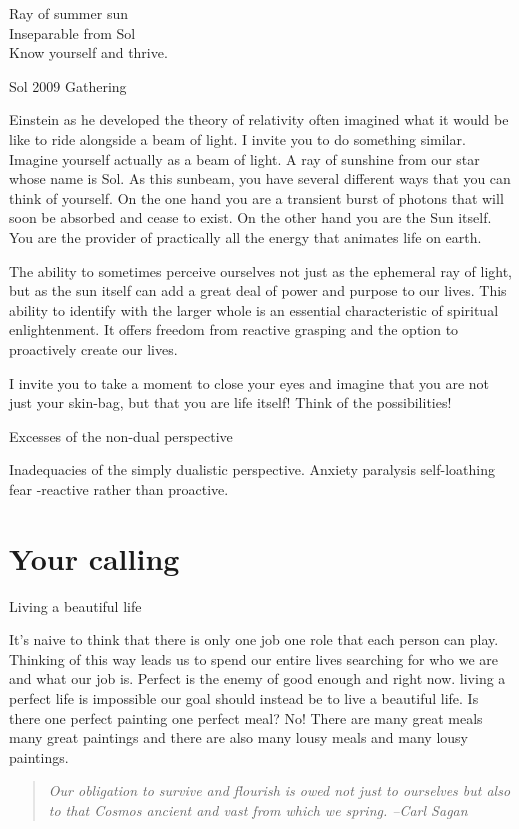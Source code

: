 \documentclass[ebook,12pt,openany,twoside]{memoir}
\begin{document}
\setlength\epigraphwidth{1.8in}
\epigraph{
  Ray of summer sun\\
  Inseparable from Sol\\
  Know yourself and thrive.
}{Sol 2009 Gathering}

\noindent Einstein as he developed the theory of relativity often imagined what it would
be like to ride alongside a beam of light. I invite you to do something
similar. Imagine yourself actually as a beam of light. A ray of sunshine from
our star whose name is Sol. As this sunbeam, you have several different ways
that you can think of yourself. On the one hand you are a transient burst of
photons that will soon be absorbed and cease to exist. On the other hand you
are the Sun itself. You are the provider of practically all the energy that
animates life on earth.

The ability to sometimes perceive ourselves not just as the ephemeral ray of
light, but as the sun itself can add a great deal of power and purpose to our
lives. This ability to identify with the larger whole is an essential
characteristic of spiritual enlightenment. It offers freedom from reactive
grasping and the option to proactively create our lives.

I invite you to take a moment to close your eyes and imagine that you are not
just your skin-bag, but that you are life itself! Think of the possibilities!

Excesses of the non-dual perspective

Inadequacies of the simply dualistic perspective. Anxiety paralysis
self-loathing fear -reactive rather than proactive.


\section*{Your calling}

Living a beautiful life

It's naive to think that there is only one job one role that each person can
play. Thinking of this way leads us to spend our entire lives searching for who
we are and what our job is. Perfect is the enemy of good enough and right now.
living a perfect life is impossible our goal should instead be to live a
beautiful life. Is there one perfect painting one perfect meal? No! There are
many great meals many great paintings and there are also many lousy meals and
many lousy paintings.


\begin{quote}
\em
Our obligation to survive and flourish is owed not just to ourselves but also
to that Cosmos ancient and vast from which we spring. --Carl Sagan
\end{quote}
\end{document}

